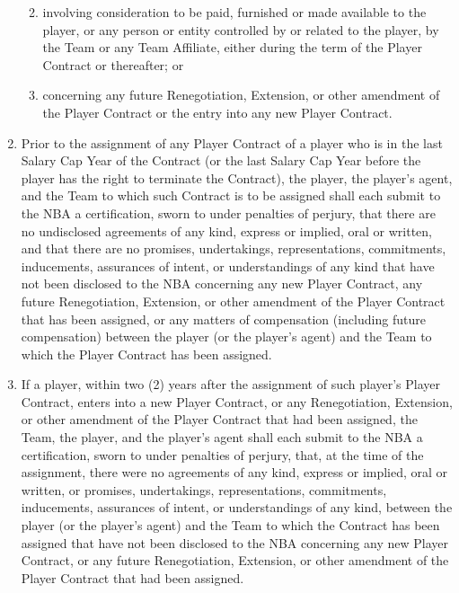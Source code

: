 \documentclass[
]{book}
\providecommand{\tightlist}{%
  \setlength{\itemsep}{0pt}\setlength{\parskip}{0pt}}
\begin{document}
\begin{enumerate}
  \begin{enumerate}
  \def\labelenumii{(\roman{enumii})}
  \tightlist
  \item
    involving consideration to be paid, furnished or made available to the player, or any person or entity controlled by or related to the player, by the Team or any Team Affiliate, either during the term of the Player Contract or thereafter; or
  \item
    concerning any future Renegotiation, Extension, or other amendment of the Player Contract or the entry into any new Player Contract.
  \end{enumerate}
\item
  Prior to the assignment of any Player Contract of a player who is in the last Salary Cap Year of the Contract (or the last Salary Cap Year before the player has the right to terminate the Contract), the player, the player's agent, and the Team to which such Contract is to be assigned shall each submit to the NBA a certification, sworn to under penalties of perjury, that there are no undisclosed agreements of any kind, express or implied, oral or written, and that there are no promises, undertakings, representations, commitments, inducements, assurances of intent, or understandings of any kind that have not been disclosed to the NBA concerning any new Player Contract, any future Renegotiation, Extension, or other amendment of the Player Contract that has been assigned, or any matters of compensation (including future compensation) between the player (or the player's agent) and the Team to which the Player Contract has been assigned.
\item
  If a player, within two (2) years after the assignment of such player's Player Contract, enters into a new Player Contract, or any Renegotiation, Extension, or other amendment of the Player Contract that had been assigned, the Team, the player, and the player's agent shall each submit to the NBA a certification, sworn to under penalties of perjury, that, at the time of the assignment, there were no agreements of any kind, express or implied, oral or written, or promises, undertakings, representations, commitments, inducements, assurances of intent, or understandings of any kind, between the player (or the player's agent) and the Team to which the Contract has been assigned that have not been disclosed to the NBA concerning any new Player Contract, or any future Renegotiation, Extension, or other amendment of the Player Contract that had been assigned.
\end{enumerate}
\end{document}
